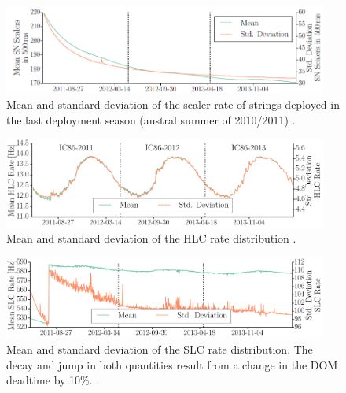 \begin{figure}[!h]
 \centering
 \includegraphics[width=0.95\textwidth]{graphics/dom/performance/darknoise/briedel4.png}
 \caption{Mean and standard deviation of the scaler rate of strings deployed in the last deployment season (austral summer of 2010/2011) \cite{briedel_phd}.}
 \label{fig:noise_over_time_briedel}
\end{figure}


\begin{figure}[!h]
 \centering
 \includegraphics[width=0.95\textwidth]{graphics/dom/performance/darknoise/briedel2.png}
 \caption{Mean and standard deviation of the HLC rate distribution \cite{briedel_phd}.}
 \label{fig:slc_over_time_briedel}
\end{figure}

\begin{figure}[!h]
 \centering
 \includegraphics[width=0.95\textwidth]{graphics/dom/performance/darknoise/briedel3.png}
 \caption{Mean and standard deviation of the SLC rate distribution. The decay and jump in both quantities result from a change in the DOM deadtime by 10\%. \cite{briedel_phd}.}
 \label{fig:hlc_over_time_briedel}
\end{figure}










%
%

